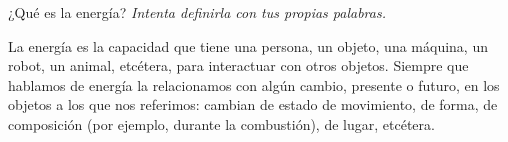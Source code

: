 ¿Qué es la energía? \emph{Intenta definirla con tus propias palabras.}

\begin{solutionbox}{5cm}
    La energía es la capacidad que tiene una
    persona, un objeto, una máquina, un robot, un animal, etcétera, para
    interactuar con otros objetos. Siempre que hablamos de energía la relacionamos con algún cambio, presente o futuro, en los objetos a los que nos
    referimos: cambian de estado de movimiento, de forma, de composición (por
    ejemplo, durante la combustión), de lugar, etcétera.
\end{solutionbox}
